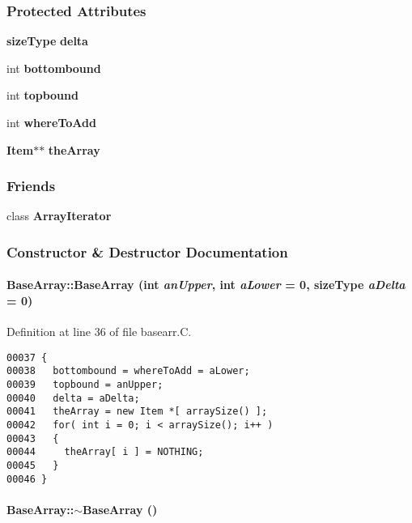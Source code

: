 \subsubsection*{Protected Attributes}
\begin{CompactItemize}
\item 
{\bf size\-Type} {\bf delta}
\item 
int {\bf bottombound}
\item 
int {\bf topbound}
\item 
int {\bf where\-To\-Add}
\item 
{\bf Item}$\ast$$\ast$ {\bf the\-Array}
\end{CompactItemize}
\subsubsection*{Friends}
\begin{CompactItemize}
\item 
class {\bf Array\-Iterator}
\end{CompactItemize}


\subsubsection{Constructor \& Destructor Documentation}
\label{BaseArray_a0}
\paragraph{\setlength{\rightskip}{0pt plus 5cm}Base\-Array::Base\-Array (int {\em an\-Upper}, int {\em a\-Lower} = 0, {\bf size\-Type} {\em a\-Delta} = 0)}\hfill



Definition at line 36 of file basearr.C.\small\begin{verbatim}00037 {
00038   bottombound = whereToAdd = aLower;
00039   topbound = anUpper;
00040   delta = aDelta;
00041   theArray = new Item *[ arraySize() ];
00042   for( int i = 0; i < arraySize(); i++ )
00043   {
00044     theArray[ i ] = NOTHING;
00045   } 
00046 }
\end{verbatim}\normalsize 
\label{BaseArray_a1}
\paragraph{\setlength{\rightskip}{0pt plus 5cm}Base\-Array::$\sim$Base\-Array ()\hspace{0.3cm}{\tt  [virtual]}}\hfill



